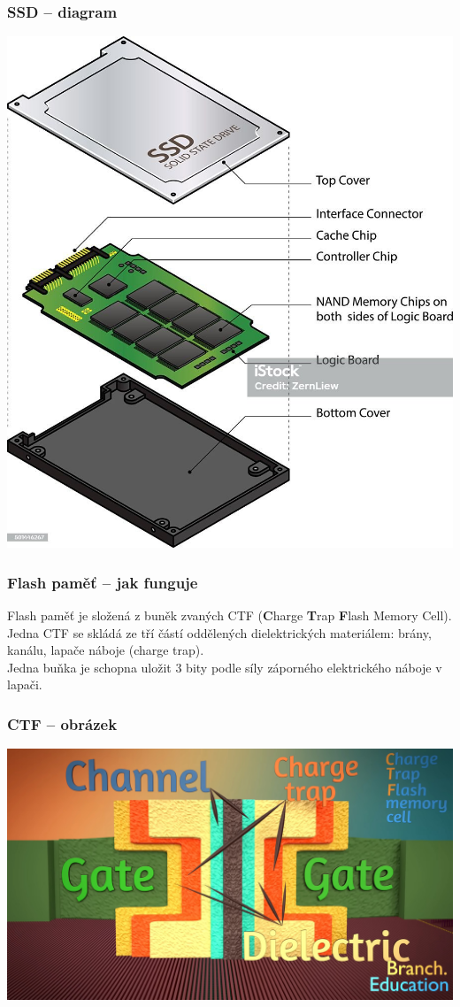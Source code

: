 \documentclass[aspectratio=169,11pt,svgnames,handout]{beamer}
\begin{document}
\begin{frame}
 \frametitle{SSD -- diagram}
 \begin{center}
  \includegraphics[width=.4\textwidth]{ssd}
 \end{center}
\end{frame}

\begin{frame}
 \frametitle{Flash paměť -- jak funguje}
 Flash paměť je složená z buněk zvaných CTF (\textbf{C}harge \textbf{T}rap
 \textbf{F}lash Memory Cell).\\
 \pause
 Jedna CTF se skládá ze tří částí oddělených dielektrických materiálem: brány,
 kanálu, lapače náboje (charge trap).\\
 \pause
 Jedna buňka je schopna uložit 3 bity podle síly záporného elektrického náboje v
 lapači.
\end{frame}

\begin{frame}
 \frametitle{CTF -- obrázek}
 \begin{center}
  \includegraphics[width=.8\textwidth]{ctf}
 \end{center}
\end{frame}
\end{document}
